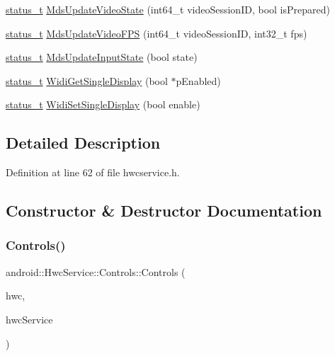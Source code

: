 \begin{DoxyCompactItemize}
\item 
\mbox{\hyperlink{hwcserviceapi_8h_a3806fb2027d9a316d8ca8d9b8b8eb96f}{status\+\_\+t}} \mbox{\hyperlink{classandroid_1_1HwcService_1_1Controls_abed610ae73b7c38693a2f2d2221c2910}{Mds\+Update\+Video\+State}} (int64\+\_\+t video\+Session\+ID, bool is\+Prepared)
\item 
\mbox{\hyperlink{hwcserviceapi_8h_a3806fb2027d9a316d8ca8d9b8b8eb96f}{status\+\_\+t}} \mbox{\hyperlink{classandroid_1_1HwcService_1_1Controls_aa87c6a814f7cf0473ecd5c10c7b0e2de}{Mds\+Update\+Video\+F\+PS}} (int64\+\_\+t video\+Session\+ID, int32\+\_\+t fps)
\item 
\mbox{\hyperlink{hwcserviceapi_8h_a3806fb2027d9a316d8ca8d9b8b8eb96f}{status\+\_\+t}} \mbox{\hyperlink{classandroid_1_1HwcService_1_1Controls_a9d0b5be8274a1e794186369c5e0f8384}{Mds\+Update\+Input\+State}} (bool state)
\item 
\mbox{\hyperlink{hwcserviceapi_8h_a3806fb2027d9a316d8ca8d9b8b8eb96f}{status\+\_\+t}} \mbox{\hyperlink{classandroid_1_1HwcService_1_1Controls_a1fa6ed897de094545383b2e865753834}{Widi\+Get\+Single\+Display}} (bool $\ast$p\+Enabled)
\item 
\mbox{\hyperlink{hwcserviceapi_8h_a3806fb2027d9a316d8ca8d9b8b8eb96f}{status\+\_\+t}} \mbox{\hyperlink{classandroid_1_1HwcService_1_1Controls_a60113daf8a701fcef054ac2da704a2b9}{Widi\+Set\+Single\+Display}} (bool enable)
\end{DoxyCompactItemize}


\subsection{Detailed Description}


Definition at line 62 of file hwcservice.\+h.



\subsection{Constructor \& Destructor Documentation}
\mbox{\label{classandroid_1_1HwcService_1_1Controls_aeacac33397b3210a02241d5d477f81e5}} 
\subsubsection{\texorpdfstring{Controls()}{Controls()}}
{\footnotesize\ttfamily android\+::\+Hwc\+Service\+::\+Controls\+::\+Controls (\begin{DoxyParamCaption}\item[{\mbox{\hyperlink{classandroid_1_1IAHWC2}{I\+A\+H\+W\+C2}} \&}]{hwc,  }\item[{\mbox{\hyperlink{classandroid_1_1HwcService}{Hwc\+Service}} \&}]{hwc\+Service }\end{DoxyParamCaption})}



